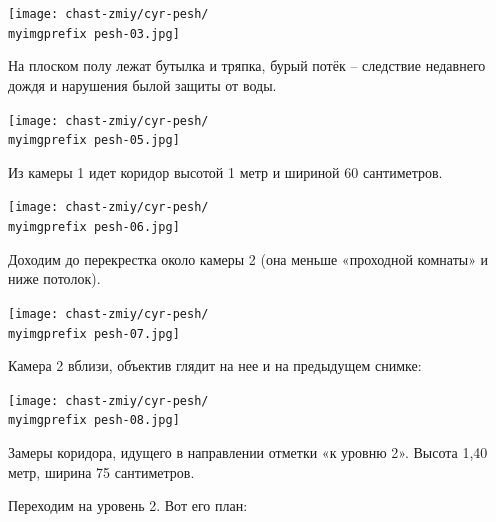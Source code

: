 \begin{center}
\texttt{[image: chast-zmiy/cyr-pesh/\\myimgprefix pesh-03.jpg]}
\end{center}

\newpage

На плоском полу лежат бутылка и тряпка, бурый потёк – следствие недавнего дождя и нарушения былой защиты от воды. 

\vspace*{\fill}
\begin{center}
\texttt{[image: chast-zmiy/cyr-pesh/\\myimgprefix pesh-05.jpg]}
\end{center}
\vspace*{\fill}

\newpage

Из камеры 1 идет коридор высотой 1 метр и шириной 60 сантиметров.

\vspace*{\fill}
\begin{center}
\texttt{[image: chast-zmiy/cyr-pesh/\\myimgprefix pesh-06.jpg]}
\end{center}
\vspace*{\fill}

\newpage

Доходим до перекрестка около камеры 2 (она меньше «проходной комнаты» и ниже потолок).

\begin{center}
\texttt{[image: chast-zmiy/cyr-pesh/\\myimgprefix pesh-07.jpg]}
\end{center}

Камера 2 вблизи, объектив глядит на нее и на предыдущем снимке:

\begin{center}
\texttt{[image: chast-zmiy/cyr-pesh/\\myimgprefix pesh-08.jpg]}
\end{center}

\newpage

Замеры коридора, идущего в направлении отметки «к уровню 2». Высота 1,40 метр, ширина 75 сантиметров.

Переходим на уровень 2. Вот его план:

